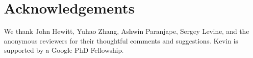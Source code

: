 \documentclass[11pt,a4paper]{article}
\begin{document}




\section*{Acknowledgements}
We thank John Hewitt, Yuhao Zhang, Ashwin Paranjape, Sergey Levine, and the  anonymous reviewers for their thoughtful comments and suggestions.
Kevin is supported by a Google PhD Fellowship.



\end{document}
